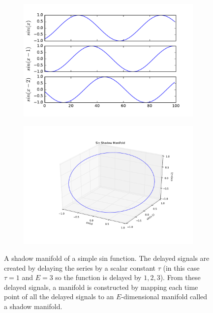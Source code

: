 \begin{figure}
	\centering
	\begin{subfigure}{0.45\textwidth}
		\includegraphics[width=\linewidth]{figures/sin_delayed_signal.pdf}
	\end{subfigure}
	\begin{subfigure}{0.45\linewidth}
		\includegraphics[width=\linewidth]{figures/sin_shadow_manifold.pdf}
	\end{subfigure}
	\caption{A shadow manifold of a simple sin function. The delayed signals are created by delaying the series by a scalar constant $\tau$ (in this case $\tau=1$ and $E=3$ so the function is delayed by $1,2,3$). From these delayed signals, a manifold is constructed by mapping each time point of all the delayed signals to an $E$-dimensional manifold called a shadow manifold.}
	\label{fig:sin_shadow_manifold}
\end{figure}


